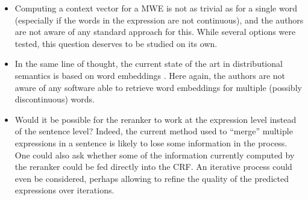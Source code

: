 \documentclass[output=paper
,modfonts
,nonflat]{langsci/langscibook}
\begin{document}
\begin{itemize}
\item Computing a context vector for a MWE is not as trivial as for a
  single word (especially if the words in the expression are not
  continuous), and the authors are not aware of any standard approach
  for this. While several options were tested, this question deserves
  to be studied on its own.
\item In the same line of thought, the current state of the art in
  distributional semantics is based on word embeddings
  \citep{legrand2016phrase}. Here again, the authors are not
  aware of any software able to retrieve word embeddings for multiple
  (possibly discontinuous) words.
\item Would it be possible for the reranker to work at the expression
  level instead of the sentence level? Indeed, the current method used
  to ``merge'' multiple expressions in a sentence is likely to lose
  some information in the process. One could also ask whether some of
  the information currently computed by the reranker could be fed directly
  into the CRF. An iterative process could even be considered, perhaps
  allowing to refine the quality of the predicted expressions over
  iterations.
\end{itemize}







\end{document}
